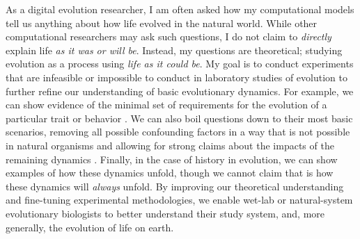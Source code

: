 As a digital evolution researcher, I am often asked how my computational models tell us anything about how life evolved in the natural world. 
While other computational researchers may ask such questions, I do not claim to \textit{directly} explain life \textit{as it was or will be}.
Instead, my questions are theoretical; studying evolution as a process using \textit{life as it could be}.
My goal is to conduct experiments that are infeasible or impossible to conduct in laboratory studies of evolution to further refine our understanding of basic evolutionary dynamics.
For example, we can show evidence of the minimal set of requirements for the evolution of a particular trait or behavior \citep{pontesEvolutionaryOriginAssociative2020, lalejini_evolutionary_2016}. 
We can also boil questions down to their most basic scenarios, removing all possible confounding factors in a way that is not possible in natural organisms and allowing for strong claims about the impacts of the remaining dynamics \citep{wilke_evolution_2001, Bohm2024.04.08.588357}. 
Finally, in the case of history in evolution, we can show examples of how these dynamics unfold, though we cannot claim that is how these dynamics will \textit{always} unfold.
By improving our theoretical understanding and fine-tuning experimental methodologies, we enable wet-lab or natural-system evolutionary biologists to better understand their study system, and, more generally, the evolution of life on earth. 

